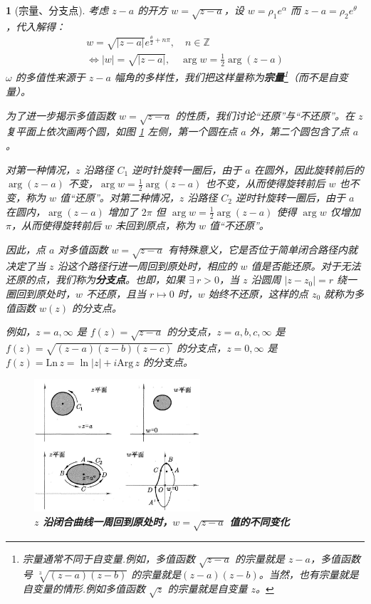 \documentclass[UTF8]{report}
\def\Arg{\mathrm{Arg}\,}
\def\Ln{\mathrm{Ln\,}}
\def\Z{\mathbb{Z}}
\theoremstyle{MyLineTheoremStyle} %
\theoremstyle{MyBlockTheoremStyle} %
\theoremstyle{MySubsubsectionStyle} %
\newtheorem{definition}{}
\begin{document}
\begin{definition}[宗量、分支点]
考虑 $z-a$ 的开方 $w =\sqrt{z-a}$，设 $w = \rho_1 e^{\alpha}$ 而 $z-a = \rho_2e^{\theta}$，代入解得：
\begin{gather}
     w = \sqrt{| z-a |} e^{\frac{\theta}{2} + n\pi}, \quad n \in \Z \\ \Longleftrightarrow 
     | w | = \sqrt{| z-a |},\quad \arg w = \frac{1}{2} \arg (z-a)
\end{gather}
$\omega $ 的多值性来源于 $z-a$ 幅角的多样性，我们把这样量称为\textbf{宗量}\footnote{宗量通常不同于自变量.例如，多值函数 $\sqrt{z-a}$ 的宗量就是 $z-a$，多值函数号 $\sqrt[3]{(z - a)(z - b)}$ 的宗量就是$(z-a)(z-b)$。当然，也有宗量就是自变量的情形.例如多值函数 $\sqrt{z}$ 的宗量就是自变量 $z$。}（而不是自变量）。

为了进一步揭示多值函数 $w = \sqrt{z-a}$ 的性质，我们讨论“还原”与“不还原”。在 $z$ 复平面上依次画两个圆，如图 \ref{沿闭合曲线一周回到原处时} 左侧，第一个圆在点 $a$ 外，第二个圆包含了点 $a$。

对第一种情况，$z$ 沿路径 $C_1$ 逆时针旋转一圈后，由于 $a$ 在圆外，因此旋转前后的 $\arg (z-a)$ 不变，$\arg w = \frac{1}{2} \arg (z-a)$ 也不变，从而使得旋转前后 $w$ 也不变，称为 $w$ 值“还原”。对第二种情况，$z$ 沿路径 $C_2$ 逆时针旋转一圈后，由于 $a$ 在圆内，$\arg (z-a)$ 增加了 $2\pi$ 但 $\arg w = \frac{1}{2} \arg (z-a)$ 使得 $\arg w$ 仅增加 $\pi$，从而使得旋转前后 $w$ 未回到原点，称为 $w$ 值“不还原”。

因此，点 $a$ 对多值函数 $w =\sqrt{z-a}$ 有特殊意义，它是否位于简单闭合路径内就决定了当 $z$ 沿这个路径行进一周回到原处时，相应的 $w$ 值是否能还原。对于无法还原的点，我们称为\textbf{分支点}。也即，如果 $\exists\ r >0$，当 $z$ 沿圆周 $| z - z_0 | = r$ 绕一圈回到原处时，$w$ 不还原，且当 $r \mapsto 0$ 时，$w$ 始终不还原，这样的点 $z_0$ 就称为多值函数 $w(z)$ 的分支点。
{\par\color{gray}\small
例如，$z = a, \infty $ 是 $ f(z) = \sqrt{z - a} $ 的分支点，$z = a,b,c, \infty$ 是 $f(z) = \sqrt{(z-a)(z-b)(z-c)} $ 的分支点，$z = 0, \infty$ 是 $ f(z) = \Ln z = \ln | z | + i\Arg z$ 的分支点。
\par}
 


\begin{figure}[H]\centering
\includegraphics[width=0.55\textwidth]{assets/image (43).jpg}
\caption{\textbf{$z$ 沿闭合曲线一周回到原处时，$w = \sqrt{z-a}$ 值的不同变化}}\label{沿闭合曲线一周回到原处时}
\end{figure}
\end{definition}
\end{document}
